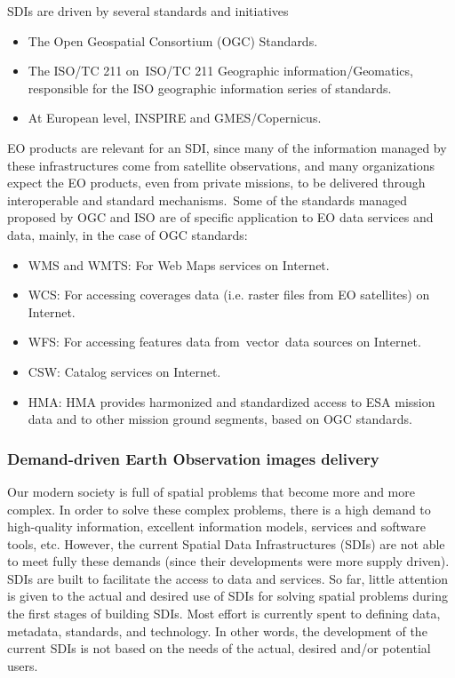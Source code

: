 \documentclass[a4paper]{article}
\newcommand\liststyleLFOxviii{%
\renewcommand\labelitemi{[F0B7?]}
\renewcommand\labelitemii{o}
\renewcommand\labelitemiii{[F0A7?]}
\renewcommand\labelitemiv{[F0B7?]}
}
\newcommand\liststyleLFOxix{%
\renewcommand\labelitemi{[F0B7?]}
\renewcommand\labelitemii{o}
\renewcommand\labelitemiii{[F0A7?]}
\renewcommand\labelitemiv{[F0B7?]}
}
\begin{document}
SDIs are driven by several standards and initiatives

\liststyleLFOxviii
\begin{itemize}
\item The Open Geospatial Consortium (OGC) Standards.
\item The ISO/TC 211 on\ ISO/TC 211 Geographic information/Geomatics,
responsible for the ISO geographic information series of standards.
\item At European level, INSPIRE and GMES/Copernicus.\ 
\end{itemize}
EO products are relevant for an SDI, since many of the information
managed by these infrastructures come from satellite observations, and
many organizations expect the EO products, even from private missions,
to be delivered through interoperable and standard mechanisms.\ Some of
the standards managed proposed by OGC and ISO are of specific
application to EO data services and data, mainly, in the case of OGC
standards:

\liststyleLFOxix
\begin{itemize}
\item WMS and WMTS: For Web Maps services on Internet.
\item WCS: For accessing coverages data (i.e. raster files from EO
satellites) on Internet.
\item WFS: For accessing features data from\ vector\ data sources on
Internet.
\item CSW: Catalog services on Internet.
\item HMA: HMA provides harmonized and standardized access to ESA
mission data and to other mission ground segments, based on OGC
standards.
\end{itemize}
\subsubsection[Demand{}-driven Earth Observation images
delivery]{Demand-driven Earth Observation images delivery}
\hypertarget{Toc381777204}{}Our modern society is full of spatial
problems that become more and more complex. In order to solve these
complex problems, there is a high demand to high-quality information,
excellent information models, services and software tools, etc.
However, the current Spatial Data Infrastructures (SDIs) are not able
to meet fully these demands (since their developments were more supply
driven). SDIs are built to facilitate the access to data and services.
So far, little attention is given to the actual and desired use of SDIs
for solving spatial problems during the first stages of building SDIs.
Most effort is currently spent to defining data, metadata, standards,
and technology. In other words, the development of the current SDIs is
not based on the needs of the actual, desired and/or potential users.
\end{document}
